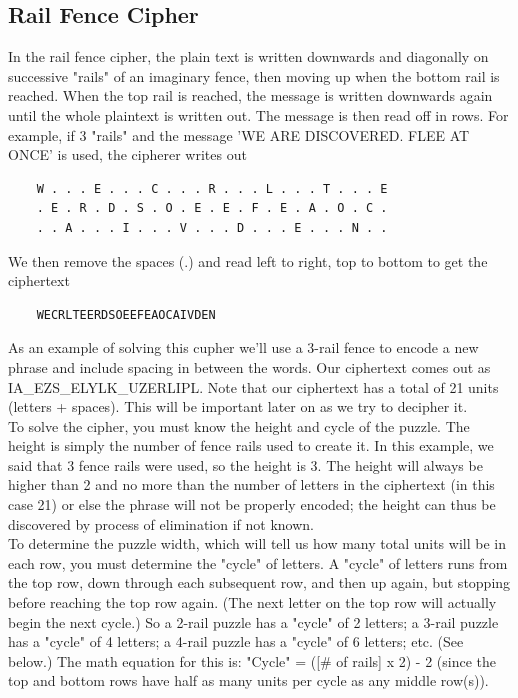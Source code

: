 \documentclass{article}
\begin{document}
\subsection*{Rail Fence Cipher}
In the rail fence cipher, the plain text is written downwards and diagonally on successive "rails" of an imaginary fence, then moving up when the bottom rail is reached. When the top rail is reached, the message is written downwards again until the whole plaintext is written out. The message is then read off in rows. For example, if 3 "rails" and the message 'WE ARE DISCOVERED. FLEE AT ONCE' is used, the cipherer writes out
\begin{lstlisting}
    W . . . E . . . C . . . R . . . L . . . T . . . E
    . E . R . D . S . O . E . E . F . E . A . O . C .
    . . A . . . I . . . V . . . D . . . E . . . N . .
\end{lstlisting}
We then remove the spaces (.) and read left to right, top to bottom to get the ciphertext
\begin{lstlisting}
    WECRLTEERDSOEEFEAOCAIVDEN
\end{lstlisting}
As an example of solving this cupher we'll use a 3-rail fence to encode a new phrase and include spacing in between the words. Our ciphertext comes out as IA\_EZS\_ELYLK\_UZERLIPL. Note that our ciphertext has a total of 21 units (letters + spaces). This will be important later on as we try to decipher it.\\[1\baselineskip]
To solve the cipher, you must know the height and cycle of the puzzle. The height is simply the number of fence rails used to create it. In this example, we said that 3 fence rails were used, so the height is 3. The height will always be higher than 2 and no more than the number of letters in the ciphertext (in this case 21) or else the phrase will not be properly encoded; the height can thus be discovered by process of elimination if not known.\\[1\baselineskip]
To determine the puzzle width, which will tell us how many total units will be in each row, you must determine the "cycle" of letters. A "cycle" of letters runs from the top row, down through each subsequent row, and then up again, but stopping before reaching the top row again. (The next letter on the top row will actually begin the next cycle.) So a 2-rail puzzle has a "cycle" of 2 letters; a 3-rail puzzle has a "cycle" of 4 letters; a 4-rail puzzle has a "cycle" of 6 letters; etc. (See below.) The math equation for this is: "Cycle" = ([\# of rails] x 2) - 2 (since the top and bottom rows have half as many units per cycle as any middle row(s)).\\[1\baselineskip]
\end{document}
